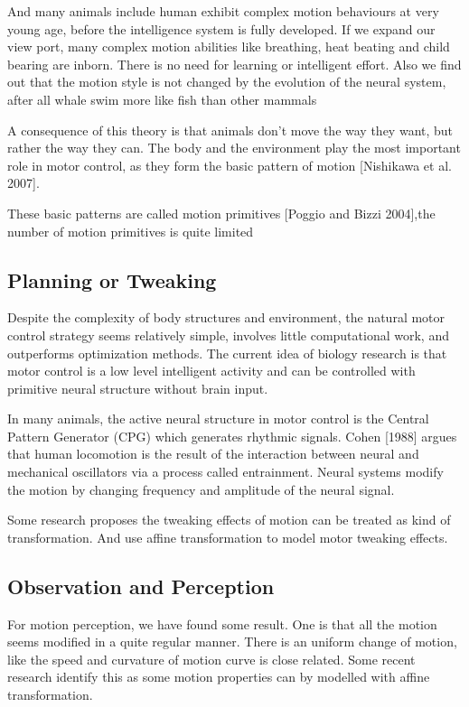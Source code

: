 And many animals include human exhibit complex motion behaviours at very young age, before the intelligence system is fully developed.
If we expand our view port, many complex motion abilities like breathing, heat beating and child bearing are inborn.
There is no need for learning or intelligent effort.
Also we find out that the motion style is not changed by the evolution of the neural system, after all whale swim more like fish than other mammals

A consequence of this theory is that animals don’t move the way they want, but rather the way they can. 
The body and the environment play the most important role in motor control, as they form the basic pattern of motion [Nishikawa et al. 2007].

These basic patterns are called motion primitives [Poggio and Bizzi 2004],the number of motion primitives is quite limited



\subsection*{Planning or Tweaking}
Despite the complexity of body structures and environment, the natural motor control strategy seems relatively simple, involves little computational work, and outperforms optimization methods. 
The current idea of biology research is that motor control is a low level intelligent activity and can be controlled with primitive neural structure without brain input. 

In many animals, the active neural structure in motor control is the Central Pattern Generator (CPG) which generates rhythmic signals.
Cohen [1988] argues that human locomotion is the result of the interaction between neural and mechanical oscillators via a process called entrainment.
Neural systems modify the motion by changing frequency and amplitude of the neural signal.


Some research proposes the tweaking effects of motion can be treated as kind of transformation. And use affine transformation to model motor tweaking effects.







\subsection*{Observation and Perception}
For motion perception, we have found some result. One is that all the motion seems modified in a quite regular manner. 
There is an uniform change of motion, like the speed and curvature of motion curve is close related.
Some recent research identify this as some motion properties can by modelled with affine transformation.

